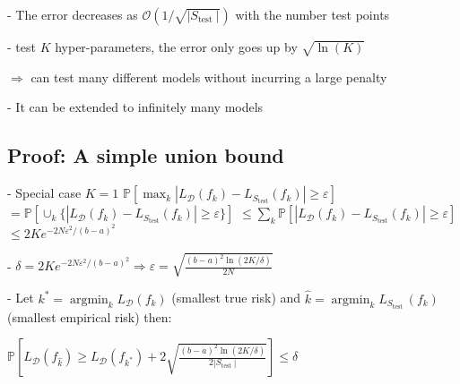- The error decreases as $\mathcal{O}(1 / \sqrt{|S_{\text {test }}|})$ with the number test points

- test $K$ hyper-parameters, the error only goes up by $\sqrt{\ln (K)}$

$\Rightarrow$ can test many different models without incurring a large penalty

- It can be extended to infinitely many models

\subsection*{Proof: A simple union bound}
- Special case $K=1$
$
\mathbb{P}[\max_{k}|L_{\mathscr{D}}(f_{k})-L_{S_{\text{test}}}(f_{k})| \geq \varepsilon]  
$
$=\mathbb{P}[\cup_{k}\{ |L_{\mathscr{D}}(f_{k})-L_{S_{\text{test}}}(f_{k})|
\geq \varepsilon\}]
$
$\leq \sum_{k} \mathbb{P}[|L_{\mathscr{D}}(f_{k})-L_{S_{\text{test}}}(f_{k})| 
 \geq \varepsilon]
$
$
 \leq 2 K e^{-2 N \varepsilon^{2} /(b-a)^{2}}
$

- $\delta=2 K e^{-2 N \varepsilon^{2} /(b-a)^{2}}\Rightarrow \varepsilon=\sqrt{\frac{(b-a)^{2} \ln (2 K / \delta)}{2 N}}$


- Let $k^{*}=\operatorname{argmin}_{k} L_{\mathscr{D}}(f_{k})$ (smallest true risk) and $\hat{k}=\operatorname{argmin}_{k} L_{S_{\text {test }}}(f_{k})$ (smallest empirical risk) then:

$
\mathbb{P}[L_{\mathscr{D}}(f_{\hat{k}}) \geq L_{\mathscr{D}}(f_{k^{*}})+2 \sqrt{\frac{(b-a)^{2} \ln (2 K / \delta)}{2|S_{\text {test }}|}}] \leq \delta
$




